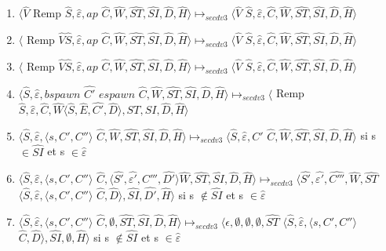 \documentclass[10pt,a4paper]{article}
\begin{document}
\begin{enumerate}
					\item $\langle\widehat{V}$ Remp $\widehat{S},\widehat{\varepsilon},ap$ $\widehat{C},\widehat{W},\widehat{ST},\widehat{SI},\widehat{D},\widehat{H}\rangle \longmapsto_{secdv3} \langle \widehat{V}$ $\widehat{S},\widehat{\varepsilon},\widehat{C},\widehat{W},\widehat{ST},\widehat{SI},\widehat{D},\widehat{H}\rangle$
					\item $\langle$ Remp $\widehat{V}\widehat{S},\widehat{\varepsilon},ap$ $\widehat{C},\widehat{W},\widehat{ST},\widehat{SI},\widehat{D},\widehat{H}\rangle \longmapsto_{secdv3} \langle \widehat{V}$ $\widehat{S},\widehat{\varepsilon},\widehat{C},\widehat{W},\widehat{ST},\widehat{SI},\widehat{D},\widehat{H}\rangle$
					\item $\langle$ Remp $\widehat{V}\widehat{S},\widehat{\varepsilon},ap$ $\widehat{C},\widehat{W},\widehat{ST},\widehat{SI},\widehat{D},\widehat{H}\rangle \longmapsto_{secdv3} \langle \widehat{V}$ $\widehat{S},\widehat{\varepsilon},\widehat{C},\widehat{W},\widehat{ST},\widehat{SI},\widehat{D},\widehat{H}\rangle$
					\item $\langle\widehat{S},\widehat{\varepsilon},bspawn$ $\widehat{C'}$ $espawn$ $\widehat{C},\widehat{W},\widehat{ST},\widehat{SI},\widehat{D},\widehat{H}\rangle \longmapsto_{secdv3} \langle$ Remp $\widehat{S},\widehat{\varepsilon},\widehat{C},\widehat{W}\langle\widehat{S},\widehat{E},\widehat{C'},\widehat{D}\rangle,\widehat{ST},\widehat{SI},\widehat{D},\widehat{H}\rangle$
			    	\item $\langle\widehat{S},\widehat{\varepsilon},\langle s, C',C''\rangle$ $\widehat{C},\widehat{W},\widehat{ST},\widehat{SI},\widehat{D},\widehat{H}\rangle \longmapsto_{secdv3} \langle\widehat{S},\widehat{\varepsilon},C'$ $\widehat{C},\widehat{W},\widehat{ST},\widehat{SI},\widehat{D},\widehat{H}\rangle$ si s $\in \widehat{SI}$ et s $\in \widehat{\varepsilon}$ 
			    	\item $\langle\widehat{S},\widehat{\varepsilon},\langle s, C',C''\rangle$ $\widehat{C},\langle\widehat{S'},\widehat{\varepsilon'},C''',\widehat{D'}\rangle\widehat{W},\widehat{ST},\widehat{SI},\widehat{D},\widehat{H}\rangle \longmapsto_{secdv3} \langle\widehat{S'},\widehat{\varepsilon'},\widehat{C'''},\widehat{W},\widehat{ST}$ $\langle\widehat{S},\widehat{\varepsilon},\langle s, C',C''\rangle$ $\widehat{C},\widehat{D}\rangle,\widehat{SI},\widehat{D'},\widehat{H}\rangle$ si s $\notin \widehat{SI}$ et s $\in \widehat{\varepsilon}$ 
			    	\item $\langle\widehat{S},\widehat{\varepsilon},\langle s, C',C''\rangle$ $\widehat{C},\emptyset,\widehat{ST},\widehat{SI},\widehat{D},\widehat{H}\rangle \longmapsto_{secdv3} \langle\epsilon,\emptyset,\emptyset,\emptyset,\widehat{ST}$ $\langle\widehat{S},\widehat{\varepsilon},\langle s, C',C''\rangle$ $\widehat{C},\widehat{D}\rangle,\widehat{SI},\emptyset,\widehat{H}\rangle$ si s $\notin \widehat{SI}$ et s $\in \widehat{\varepsilon}$ 

\end{enumerate}
\end{document}

